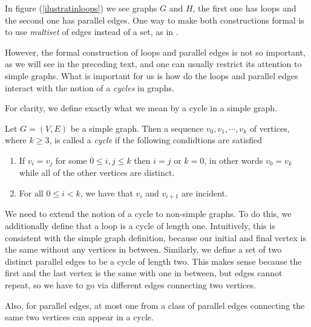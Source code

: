 In figure (\ref{ilustratinloops}) we see graphs $G$ and $H$, the first one has loops and the second one has parallel edges. One way to make both constructions formal is to use \textit{multiset} of edges instead of a set, as in \cite[4]{oxley1}.

However, the formal construction of loops and parallel edges is not so important, as we will see in the preceding text, and one can usually restrict its attention to simple graphs. What is important for us is how do the loops and parallel edges interact with the notion of a \textit{cycles} in graphs. 

For clarity, we define exactly what we mean by a cycle in a simple graph.

\begin{defn}
    Let $G = (V,E)$ be a simple graph. Then a sequence $v_0, v_1, \cdots, v_k$ of vertices, where $k\geq 3$, is called a \textit{cycle} if the following condidtions are satisfied
    
    \begin{enumerate}

        \item If $v_i = v_j$ for some $0 \leq i,j \leq k$ then $i = j$ or $k = 0$, in other words $v_0 = v_k$ while all of the other vertices are distinct. 
        
        \item For all $0\leq i < k$, we have that $v_i$ and $v_{i+1}$ are incident.
    \end{enumerate}
\end{defn}

We need to extend the notion of a cycle to non-simple graphs. To do this, we additionally define that a loop is a cycle of length one. Intuitively, this is consistent with the simple graph definition, because our initial and final vertex is the same without any vertices in between. Similarly, we define a set of two distinct parallel edges to be a cycle of length two. This makes sense because the first and the last vertex is the same with one in between, but edges cannot repeat, so we have to go via different edges connecting two vertices.





Also, for parallel edges, at most one from a class of parallel edges connecting the same two vertices can appear in a cycle.


